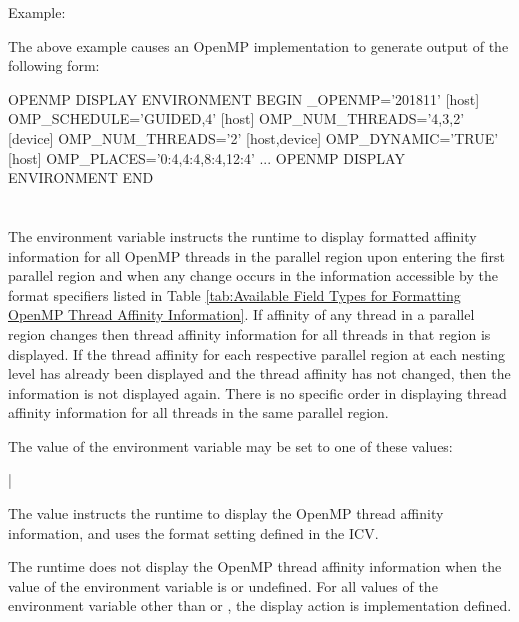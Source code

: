 Example:
\begin{ompEnv}
\end{ompEnv}

The above example causes an OpenMP implementation to generate output of the
following form:

\begin{ompEnv}
OPENMP DISPLAY ENVIRONMENT BEGIN
  _OPENMP='201811'
  [host] OMP_SCHEDULE='GUIDED,4'
  [host] OMP_NUM_THREADS='4,3,2'
  [device] OMP_NUM_THREADS='2'
  [host,device] OMP_DYNAMIC='TRUE'
  [host] OMP_PLACES='{0:4},{4:4},{8:4},{12:4}'
  ...
OPENMP DISPLAY ENVIRONMENT END
\end{ompEnv}


\section{}
\label{sec:OMP_DISPLAY_AFFINITY}
The  environment variable instructs the runtime to
display formatted affinity information for all OpenMP threads in the parallel
region upon entering the first parallel region and when any change occurs in
the information accessible by the format specifiers listed in Table
\ref{tab:Available Field Types for Formatting OpenMP Thread Affinity Information}.
If affinity of any thread in a parallel region changes then thread
affinity information for all threads in that region is displayed.
If the thread affinity for each respective parallel region at each nesting level
has already been displayed and the thread affinity has not changed, then the
information is not displayed again. There is no specific order in displaying
thread affinity information for all threads in the same parallel region.

The value of the  environment variable may be set
to one of these values:

{|}

The  value instructs the runtime to display the OpenMP thread
affinity information, and uses the format setting defined in the
 ICV.

The runtime does not display the OpenMP thread affinity information when the
value of the  environment variable is 
or undefined. For all values of the environment variable other than 
or , the display action is implementation defined.

